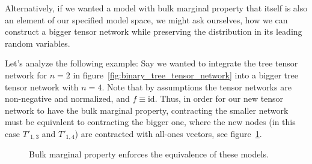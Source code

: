 \documentclass[../../main.tex]{subfiles}
\begin{document}
    Alternatively, if we wanted a model with bulk marginal property that itself is also an element of our specified model space, we might ask ourselves, how we can construct a bigger tensor network while preserving the distribution in its leading random variables.

    Let's analyze the following example: Say we wanted to integrate the tree tensor network for $n = 2$ in figure~\ref{fig:binary_tree_tensor_network} into a bigger tree tensor network with $n = 4$. Note that by assumptions the tensor networks are non-negative and normalized, and $f \equiv \text{id}$. Thus, in order for our new tensor network to have the bulk marginal property, contracting the smaller network must be equivalent to contracting the bigger one, where the new nodes (in this case $T'_{1,3}$ and $T'_{1,4}$) are contracted with all-ones vectors, see figure~\ref{fig:bmp_model_equiv}.

    \begin{figure}[h]
        \centering
        \caption{Bulk marginal property enforces the equivalence of these models.}
        \label{fig:bmp_model_equiv}
    \end{figure}
\end{document}
